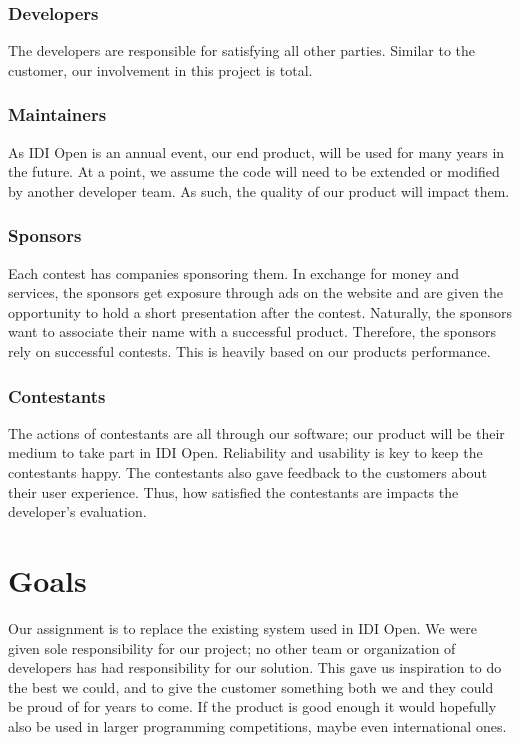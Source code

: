 \subsubsection{Developers}
The developers are responsible for satisfying all other parties. Similar
to the customer, our involvement in this project is total.

\subsubsection{Maintainers}
As IDI Open is an annual event, our end product, will be used for many 
years in the future. At a point, we assume the code will need to be 
extended or modified by another developer team. 
As such, the quality of our product will impact them.

\subsubsection{Sponsors}
Each contest has companies sponsoring them. In exchange for money and
services, the sponsors get exposure through ads on the website and are
given the opportunity to hold a short presentation after the contest. Naturally, the
sponsors want to associate their name with a successful product.
Therefore, the sponsors rely on successful contests. This is
heavily based on our products performance.

\subsubsection{Contestants}
The actions of contestants are all through our software; our product will be
their medium to take part in IDI Open. Reliability and usability is key to keep
the contestants happy. The contestants also gave feedback to the customers
about their user experience. Thus, how satisfied the contestants are impacts
the developer's evaluation.

\section{Goals}
Our assignment is to replace the existing system used in IDI Open. We were
given sole responsibility for our project; no other team or organization of
developers has had responsibility for our solution. This gave us inspiration to
do the best we could, and to give the customer something both we and they could
be proud of for years to come. If the product is good enough it would
hopefully also be used in larger programming competitions, maybe even
international ones.
